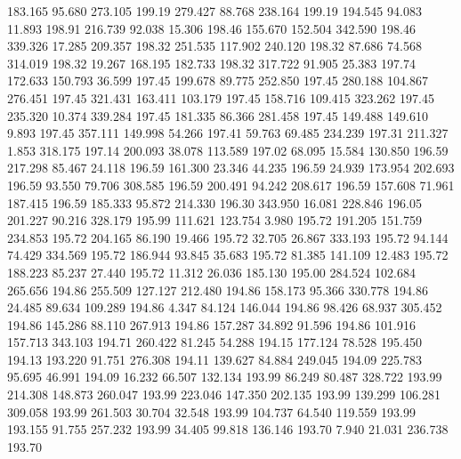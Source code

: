  183.165   95.680  273.105       199.19
 279.427   88.768  238.164       199.19
 194.545   94.083   11.893       198.91
 216.739   92.038   15.306       198.46
 155.670  152.504  342.590       198.46
 339.326   17.285  209.357       198.32
 251.535  117.902  240.120       198.32
  87.686   74.568  314.019       198.32
  19.267  168.195  182.733       198.32
 317.722   91.905   25.383       197.74
 172.633  150.793   36.599       197.45
 199.678   89.775  252.850       197.45
 280.188  104.867  276.451       197.45
 321.431  163.411  103.179       197.45
 158.716  109.415  323.262       197.45
 235.320   10.374  339.284       197.45
 181.335   86.366  281.458       197.45
 149.488  149.610    9.893       197.45
 357.111  149.998   54.266       197.41
  59.763   69.485  234.239       197.31
 211.327    1.853  318.175       197.14
 200.093   38.078  113.589       197.02
  68.095   15.584  130.850       196.59
 217.298   85.467   24.118       196.59
 161.300   23.346   44.235       196.59
  24.939  173.954  202.693       196.59
  93.550   79.706  308.585       196.59
 200.491   94.242  208.617       196.59
 157.608   71.961  187.415       196.59
 185.333   95.872  214.330       196.30
 343.950   16.081  228.846       196.05
 201.227   90.216  328.179       195.99
 111.621  123.754    3.980       195.72
 191.205  151.759  234.853       195.72
 204.165   86.190   19.466       195.72
  32.705   26.867  333.193       195.72
  94.144   74.429  334.569       195.72
 186.944   93.845   35.683       195.72
  81.385  141.109   12.483       195.72
 188.223   85.237   27.440       195.72
  11.312   26.036  185.130       195.00
 284.524  102.684  265.656       194.86
 255.509  127.127  212.480       194.86
 158.173   95.366  330.778       194.86
  24.485   89.634  109.289       194.86
   4.347   84.124  146.044       194.86
  98.426   68.937  305.452       194.86
 145.286   88.110  267.913       194.86
 157.287   34.892   91.596       194.86
 101.916  157.713  343.103       194.71
 260.422   81.245   54.288       194.15
 177.124   78.528  195.450       194.13
 193.220   91.751  276.308       194.11
 139.627   84.884  249.045       194.09
 225.783   95.695   46.991       194.09
  16.232   66.507  132.134       193.99
  86.249   80.487  328.722       193.99
 214.308  148.873  260.047       193.99
 223.046  147.350  202.135       193.99
 139.299  106.281  309.058       193.99
 261.503   30.704   32.548       193.99
 104.737   64.540  119.559       193.99
 193.155   91.755  257.232       193.99
  34.405   99.818  136.146       193.70
   7.940   21.031  236.738       193.70
